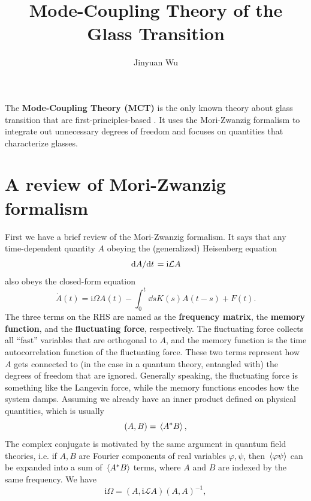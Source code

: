 \documentclass[hyperref, a4paper]{article}
\title{Mode-Coupling Theory of the Glass Transition}
\author{Jinyuan Wu}
\newcommand*{\ii}{\mathrm{i}}
\newcommand*{\concept}[1]{{\textbf{#1}}}
\begin{document}
\maketitle

The \concept{Mode-Coupling Theory (MCT)} is the only known theory about glass transition that are
first-principles-based \cite{mct2005,mct-primer}. It uses the Mori-Zwanzig formalism 
\cite{MoriZwanzigformalismWikipedia} to integrate out unnecessary degrees of freedom and focuses 
on quantities that characterize glasses.

\section{A review of Mori-Zwanzig formalism}

First we have a brief review of the Mori-Zwanzig formalism. 
It says that any time-dependent quantity $A$ obeying the (generalized) Heisenberg equation 
\begin{equation}
    \dv*{A}{t} = \ii \mathcal{L} A
\end{equation}
also obeys the closed-form equation
\begin{equation}
    {\dot {A}}(t)= \ii \Omega A(t) - \int _{0}^{t} \dd{s} K(s)A(t-s)+F(t).
    \label{eq:closed-form-a}
\end{equation}
The three terms on the RHS are named as the \concept{frequency matrix}, the \concept{memory function}, 
and the \concept{fluctuating force}, respectively. The fluctuating force collects all ``fast'' variables that 
are orthogonal to $A$, and the memory function is the time autocorrelation function of the fluctuating force.
These two terms represent how $A$ gets connected to (in the case in a quantum theory, entangled with) the degrees of
freedom that are ignored. Generally speaking, the fluctuating force is something like the Langevin force, while 
the memory functions encodes how the system damps.  
Assuming we already have an inner product defined on physical quantities, which is usually 
\begin{equation}
    (A, B) = \expval*{A^* B},
    \label{eq:inner-product-def}
\end{equation}
The complex conjugate is motivated by the same argument in quantum field theories, i.e. if $A, B$ are Fourier 
components of real variables $\varphi, \psi$, then $\expval*{\varphi \psi}$ can be expanded into a sum of 
$\expval*{A^* B}$ terms, where $A$ and $B$ are indexed by the same frequency.
We have 
\begin{equation}
    \ii \Omega =(A, \ii \mathcal{L} A)(A,A)^{-1},
\end{equation}
\end{document}
